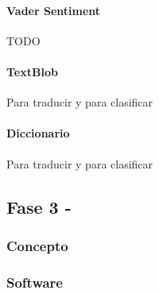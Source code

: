 \documentclass[../all.tex]{subfiles}
\begin{document}
        \paragraph{Vader Sentiment}
            {\color{red} 
                TODO
            }
        \paragraph{TextBlob}
            {\color{red} 
            Para traducir y para clasificar
            }
        \paragraph{Diccionario}
            {\color{red} 
            Para traducir y para clasificar
            }
\newpage
\subsection{Fase 3 - }
    \subsubsection{Concepto}

    \subsubsection{Software}
\end{document}
